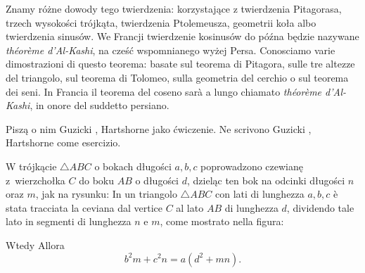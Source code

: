 Znamy różne dowody tego twierdzenia: korzystające z twierdzenia Pitagorasa, trzech wysokości trójkąta, twierdzenia Ptolemeusza, geometrii koła albo twierdzenia sinusów. %
We Francji twierdzenie kosinusów do późna będzie nazywane \emph{théorème d'Al-Kashi}, na cześć wspomnianego wyżej Persa. %
Conosciamo varie dimostrazioni di questo teorema: basate sul teorema di Pitagora, sulle tre altezze del triangolo, sul teorema di Tolomeo, sulla geometria del cerchio o sul teorema dei seni. %
In Francia il teorema del coseno sarà a lungo chiamato \emph{théorème d'Al-Kashi}, in onore del suddetto persiano. %

Piszą o nim Guzicki \cite[s. 258]{guzicki_2021}, Hartshorne \cite[s. 185]{hartshorne_2000} jako ćwiczenie. %
Ne scrivono Guzicki \cite[s. 258]{guzicki_2021}, Hartshorne \cite[s. 185]{hartshorne_2000} come esercizio. %

\begin{theorem}
[Stewarta, 1746] %
[di Stewart, 1746] %
\label{twierdzenie_stewarta}%
%
	W trójkącie $\triangle ABC$ o bokach długości $a, b, c$ poprowadzono czewianę z~wierzchołka $C$ do boku $AB$ o długości $d$, dzieląc ten bok na odcinki długości $n$ oraz $m$, jak na rysunku: %
	In un triangolo $\triangle ABC$ con lati di lunghezza $a, b, c$ è stata tracciata la ceviana dal vertice $C$ al lato $AB$ di lunghezza $d$, dividendo tale lato in segmenti di lunghezza $n$ e $m$, come mostrato nella figura: %
	\begin{center}

    \end{center}
	Wtedy %
	Allora %
	\begin{equation}
		b^2 m + c^2 n = a (d^2 + mn).
	\end{equation}
\end{theorem}


